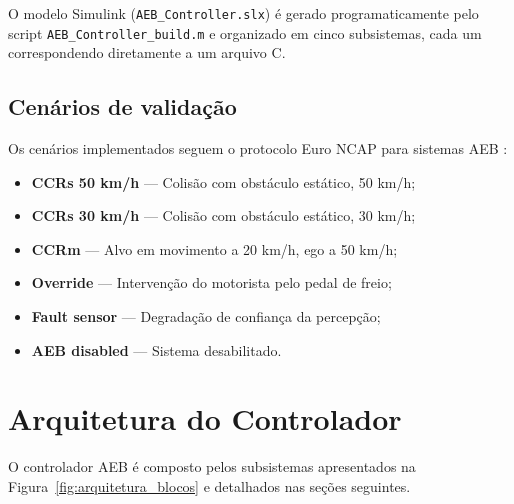 \documentclass[12pt,a4paper]{article}
\begin{document}
O modelo Simulink (\texttt{AEB\_Controller.slx}) é gerado programaticamente
pelo script \texttt{AEB\_Controller\_build.m} e organizado em cinco
subsistemas, cada um correspondendo diretamente a um arquivo C.

\subsection{Cenários de validação}

Os cenários implementados seguem o protocolo Euro NCAP para sistemas AEB
\cite{euronncap2022}:

\begin{itemize}[noitemsep]
    \item \textbf{CCRs 50 km/h} --- Colisão com obstáculo estático, 50 km/h;
    \item \textbf{CCRs 30 km/h} --- Colisão com obstáculo estático, 30 km/h;
    \item \textbf{CCRm} --- Alvo em movimento a 20 km/h, ego a 50 km/h;
    \item \textbf{Override} --- Intervenção do motorista pelo pedal de freio;
    \item \textbf{Fault sensor} --- Degradação de confiança da percepção;
    \item \textbf{AEB disabled} --- Sistema desabilitado.
\end{itemize}

\section{Arquitetura do Controlador}
\label{sec:arquitetura}

O controlador AEB é composto pelos subsistemas apresentados na
Figura~\ref{fig:arquitetura_blocos} e detalhados nas seções seguintes.
\end{document}
